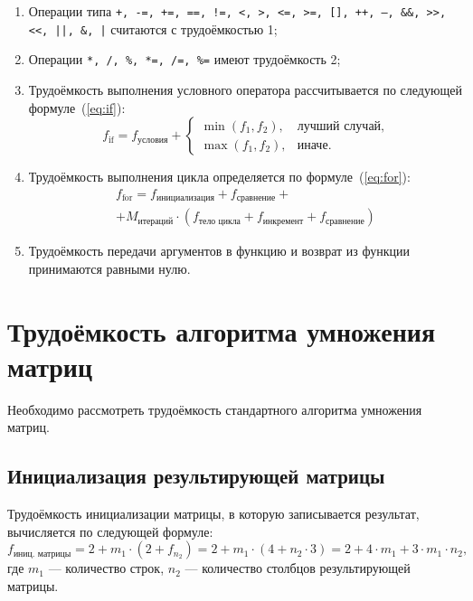 \documentclass[a4paper, 12pt]{extreport}
\begin{document}
\begin{enumerate}
    \item[--] Операции типа \texttt{+, -=, +=, ==, !=, <, >, <=, >=, [], ++, --, \&\&, >>, <<, ||, \&, |} считаются с трудоёмкостью 1;
    
    \item[--] Операции \texttt{*, /, \%, *=, /=, \%=} имеют трудоёмкость 2;

    \item[--] Трудоёмкость выполнения условного оператора рассчитывается по следующей формуле~(\ref{eq:if}):
    \begin{equation}
    \label{eq:if}
    f_{\text{if}} = f_{\text{условия}} + 
    \begin{cases}
      \min(f_1, f_2), & \text{лучший случай},\\
      \max(f_1, f_2), & \text{иначе}.
    \end{cases}
    \end{equation}
    
    \item[--] Трудоёмкость выполнения цикла определяется по формуле~(\ref{eq:for}):
    \begin{equation}
    \label{eq:for}
    \begin{gathered}
      f_{\text{for}} = f_{\text{инициализация}} + f_{\text{сравнение}} +\\
      + M_{\text{итераций}} \cdot (f_{\text{тело цикла}} + f_{\text{инкремент}} + f_{\text{сравнение}})
    \end{gathered}
    \end{equation}

    \item[--] Трудоёмкость передачи аргументов в функцию и возврат из функции принимаются равными нулю.
\end{enumerate}

\section{Трудоёмкость алгоритма умножения матриц}

Необходимо рассмотреть трудоёмкость стандартного алгоритма умножения матриц.

\subsection{Инициализация результирующей матрицы}

Трудоёмкость инициализации матрицы, в которую записывается результат, вычисляется по следующей формуле:
\begin{equation}
f_{\text{иниц. матрицы}} = 2 + m_1 \cdot (2 + f_{n_2}) = 2 + m_1 \cdot (4 + n_2 \cdot 3) = 2 + 4 \cdot m_1 + 3 \cdot m_1 \cdot n_2,
\end{equation}
где $m_1$ — количество строк, $n_2$ — количество столбцов результирующей матрицы.
\end{document}
